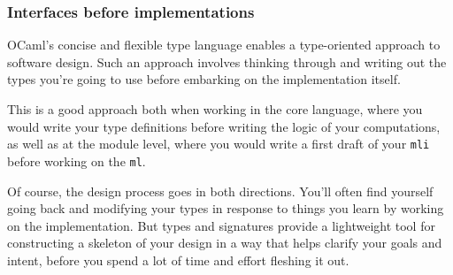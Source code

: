 \hypertarget{interfaces-before-implementations}{%
\subsubsection{Interfaces before
implementations}\label{interfaces-before-implementations}}

OCaml's concise and flexible type language enables a type-oriented
approach to software design. Such an approach involves thinking through
and writing out the types you're going to use before embarking on the
implementation itself.

This is a good approach both when working in the core language, where
you would write your type definitions before writing the logic of your
computations, as well as at the module level, where you would write a
first draft of your \passthrough{\lstinline!mli!} before working on the
\passthrough{\lstinline!ml!}.

Of course, the design process goes in both directions. You'll often find
yourself going back and modifying your types in response to things you
learn by working on the implementation. But types and signatures provide
a lightweight tool for constructing a skeleton of your design in a way
that helps clarify your goals and intent, before you spend a lot of time
and effort fleshing it out.
